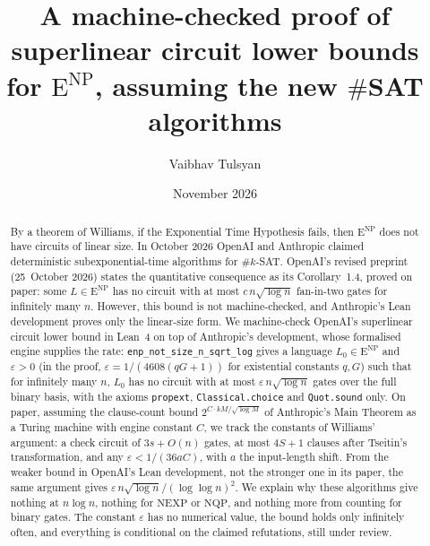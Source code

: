 \documentclass[10pt]{amsart}
\theoremstyle{plain}
\theoremstyle{definition}
\theoremstyle{remark}
\numberwithin{equation}{section}
\newcommand{\ENP}{\mathrm{E}^{\mathrm{NP}}}
\begin{document}
\title[A machine-checked superlinear circuit lower bound for $\mathrm{E}^{\mathrm{NP}}$]{A machine-checked proof of superlinear circuit lower bounds\\ for $\mathrm{E}^{\mathrm{NP}}$, assuming the new $\#$SAT algorithms}

\author{Vaibhav Tulsyan}

\date{November 2026}


\begin{abstract}
By a theorem of Williams, if the Exponential Time Hypothesis fails, then $\ENP$ does not have
circuits of linear size. In October 2026 OpenAI and Anthropic claimed deterministic
subexponential-time algorithms for $\#k$-SAT. OpenAI's revised preprint (25~October 2026) states the
quantitative consequence as its Corollary~1.4, proved on paper: some $L\in\ENP$ has no circuit with
at most $c\,n\sqrt{\log n}$ fan-in-two gates for infinitely many $n$. However, this bound is not
machine-checked, and Anthropic's Lean development proves only the linear-size form. We machine-check
OpenAI's superlinear circuit lower bound in Lean~4 on top of Anthropic's development, whose formalised
engine supplies the rate: \texttt{enp\_not\_size\_n\_sqrt\_log} gives a language $L_0\in\ENP$ and
$\varepsilon>0$ (in the proof, $\varepsilon=1/(4608(qG+1))$ for existential constants $q,G$) such that
for infinitely many $n$, $L_0$ has no circuit with at most $\varepsilon\,n\sqrt{\log n}$ gates over
the full binary basis, with the axioms \texttt{propext}, \texttt{Classical.choice} and
\texttt{Quot.sound} only. On paper, assuming the clause-count bound $2^{C\cdot kM/\sqrt{\log M}}$ of
Anthropic's Main Theorem as a Turing machine with engine constant $C$, we track the constants of
Williams' argument: a check circuit of $3s+O(n)$ gates, at most $4S+1$ clauses after Tseitin's
transformation, and any $\varepsilon<1/(36aC)$, with $a$ the input-length shift. From the weaker bound in OpenAI's Lean development, not the stronger one in
its paper, the same argument gives $\varepsilon\,n\sqrt{\log n}/(\log\log n)^2$. We explain why
these algorithms give nothing at $n\log n$, nothing for $\mathrm{NEXP}$ or $\mathrm{NQP}$, and
nothing more from counting for binary gates. The constant $\varepsilon$ has no numerical value, the bound holds only
infinitely often, and everything is conditional on the claimed refutations, still under review.
\end{abstract}
\end{document}
